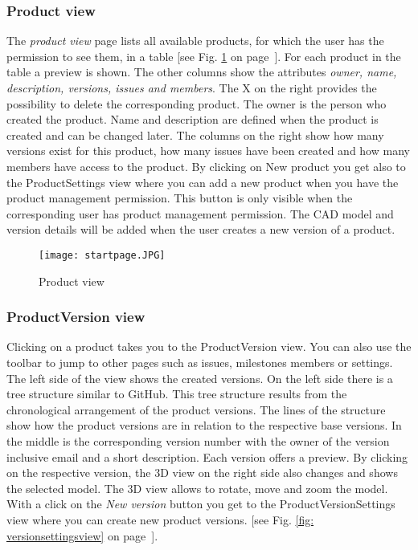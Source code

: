 \subsubsection*{Product view}

The \textit{product view} page lists all available products, for which the user has the permission to see them, in a table [see Fig. \ref{fig: startpage} on page~\pageref{fig: startpage}]. For each product in the table a preview is shown. The other columns show the attributes \textit{owner, name, description, versions, issues and members}. The X on the right provides the possibility to delete the corresponding product. The owner is the person who created the product. Name and description are defined when the product is created and can be changed later. The columns on the right show how many versions exist for this product, how many issues have been created and how many members have access to the product. By clicking on New product you get also to the ProductSettings view where you can add a new product when you have the product management permission. This button is only visible when the corresponding user has product management permission. The CAD model and version details will be added when the user creates a new version of a product.

\begin{figure}[h]
    \centering
    \texttt{[image: startpage.JPG]}
    \caption{Product view}
    \label{fig: startpage}
\end{figure}

\subsubsection*{ProductVersion view}

Clicking on a product takes you to the ProductVersion view. You can also use the toolbar to jump to other pages such as issues, milestones members or settings. The left side of the view shows the created versions. On the left side there is a tree structure similar to GitHub. This tree structure results from the chronological arrangement of the product versions. The lines of the structure show how the product versions are in relation to the respective base versions. In the middle is the corresponding version number with the owner of the version inclusive email and a short description. Each version offers a preview. By clicking on the respective version, the 3D view on the right side also changes and shows the selected model. The 3D view allows to rotate, move and zoom the model. 
With a click on the \textit{New version} button you get to the ProductVersionSettings view where you can create new product versions. [see Fig. \ref{fig: versionsettingsview} on page~\pageref{fig: versionsettingsview}]. 


